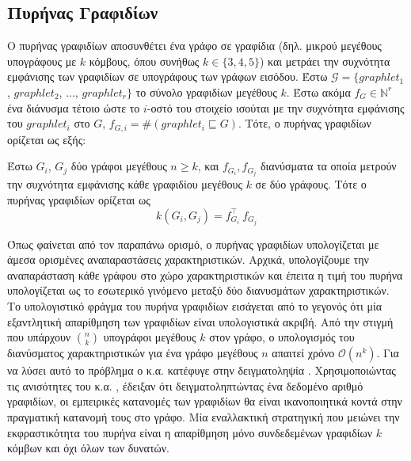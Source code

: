 \subsection{Πυρήνας Γραφιδίων}
\label{ssec:gr}
Ο πυρήνας γραφιδίων αποσυνθέτει ένα γράφο σε γραφίδια (δηλ. μικρού μεγέθους υπογράφους με $k$ κόμβους, όπου συνήθως $k \in \{ 3,4,5\}$) \cite{prvzulj2007biological} και μετράει την συχνότητα εμφάνισης των γραφιδίων σε υπογράφους των γράφων εισόδου.
Έστω $\mathcal{G} = \{ graphlet_1$, $graphlet_2$, $\ldots$, $graphlet_r\}$ το σύνολο γραφιδίων μεγέθους $k$.
Έστω ακόμα $f_G \in \mathbb{N}^r$ ένα διάνυσμα τέτοιο ώστε το $i$-οστό του στοιχείο ισούται με την συχνότητα εμφάνισης του $graphlet_i$ στο $G$, $f_{G,i} = \#(graphlet_i \sqsubseteq G)$.
Τότε, ο πυρήνας γραφιδίων ορίζεται ως εξής:
\begin{definition}
	Έστω $G_i$, $G_j$ δύο γράφοι μεγέθους $n \geq k$, και $f_{G_i}, f_{G_j}$ διανύσματα τα οποία μετρούν την συχνότητα εμφάνισης κάθε γραφιδίου μεγέθους $k$ σε δύο γράφους. 
	Τότε ο πυρήνας γραφιδίων ορίζεται ως
	\begin{equation}
  		k(G_i,G_j) = f_{G_i}^\top \ f_{G_j}
  	\end{equation}
\end{definition}
Όπως φαίνεται από τον παραπάνω ορισμό, ο πυρήνας γραφιδίων υπολογίζεται με άμεσα ορισμένες αναπαραστάσεις χαρακτηριστικών.
Αρχικά, υπολογίζουμε την αναπαράσταση κάθε γράφου στο χώρο χαρακτηριστικών και έπειτα η τιμή του πυρήνα υπολογίζεται ως το εσωτερικό γινόμενο μεταξύ δύο διανυσμάτων χαρακτηριστικών.
Το υπολογιστικό φράγμα του πυρήνα γραφιδίων εισάγεται από το γεγονός ότι μία εξαντλητική απαρίθμηση των γραφιδίων είναι υπολογιστικά ακριβή.
Από την στιγμή που υπάρχουν $\binom{n}{k}$ υπογράφοι μεγέθους $k$ στον γράφο, ο υπολογισμός του διανύσματος χαρακτηριστικών για ένα γράφο μεγέθους $n$ απαιτεί χρόνο $\mathcal{O}(n^k)$.
Για να λύσει αυτό το πρόβλημα ο  κ.α. κατέφυγε στην δειγματοληψία \cite{shervashidze2009efficient}. 
Χρησιμοποιώντας τις ανισότητες του  κ.α. \cite{weissman2003inequalities}, έδειξαν ότι δειγματοληπτώντας ένα δεδομένο αριθμό γραφιδίων, οι εμπειρικές κατανομές των γραφιδίων θα είναι ικανοποιητικά κοντά στην πραγματική κατανομή τους στο γράφο.
Μία εναλλακτική στρατηγική που μειώνει την εκφραστικότητα του πυρήνα είναι η απαρίθμηση μόνο συνδεδεμένων γραφιδίων $k$ κόμβων και όχι όλων των δυνατών.

